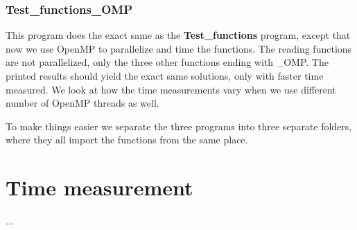 \documentclass[12pt,a4paper,english]{article}
\begin{document}
\subsubsection{Test\_functions\_OMP}
This program does the exact same as the \textbf{Test\_functions} program, except that now we use OpenMP to parallelize and time the functions. The reading functions are not parallelized, only the three other functions ending with \_OMP. The printed results should yield the exact same solutions, only with faster time measured. We look at how the time measurements vary when we use different number of OpenMP threads as well. 

To make things easier we separate the three programs into three separate folders, where they all import the functions from the same place. 

\section{Time measurement}
\label{sect:Time}
...
\end{document}

